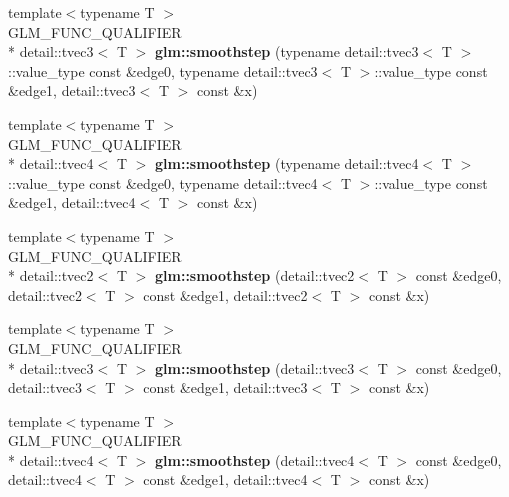 \begin{DoxyCompactItemize}
\item 
\hypertarget{namespaceglm_ad4f7ebb9a2c7c0980deb0580f951ea75}{{\footnotesize template$<$typename T $>$ }\\G\-L\-M\-\_\-\-F\-U\-N\-C\-\_\-\-Q\-U\-A\-L\-I\-F\-I\-E\-R \\*
detail\-::tvec3$<$ T $>$ {\bfseries glm\-::smoothstep} (typename detail\-::tvec3$<$ T $>$\-::value\-\_\-type const \&edge0, typename detail\-::tvec3$<$ T $>$\-::value\-\_\-type const \&edge1, detail\-::tvec3$<$ T $>$ const \&x)}\label{namespaceglm_ad4f7ebb9a2c7c0980deb0580f951ea75}

\item 
\hypertarget{namespaceglm_a17525ba6123f56066046fe07b127e006}{{\footnotesize template$<$typename T $>$ }\\G\-L\-M\-\_\-\-F\-U\-N\-C\-\_\-\-Q\-U\-A\-L\-I\-F\-I\-E\-R \\*
detail\-::tvec4$<$ T $>$ {\bfseries glm\-::smoothstep} (typename detail\-::tvec4$<$ T $>$\-::value\-\_\-type const \&edge0, typename detail\-::tvec4$<$ T $>$\-::value\-\_\-type const \&edge1, detail\-::tvec4$<$ T $>$ const \&x)}\label{namespaceglm_a17525ba6123f56066046fe07b127e006}

\item 
\hypertarget{namespaceglm_af602ff787e99445553837e916d4268f8}{{\footnotesize template$<$typename T $>$ }\\G\-L\-M\-\_\-\-F\-U\-N\-C\-\_\-\-Q\-U\-A\-L\-I\-F\-I\-E\-R \\*
detail\-::tvec2$<$ T $>$ {\bfseries glm\-::smoothstep} (detail\-::tvec2$<$ T $>$ const \&edge0, detail\-::tvec2$<$ T $>$ const \&edge1, detail\-::tvec2$<$ T $>$ const \&x)}\label{namespaceglm_af602ff787e99445553837e916d4268f8}

\item 
\hypertarget{namespaceglm_ae5221c42b168a958dcc60b053d8610c1}{{\footnotesize template$<$typename T $>$ }\\G\-L\-M\-\_\-\-F\-U\-N\-C\-\_\-\-Q\-U\-A\-L\-I\-F\-I\-E\-R \\*
detail\-::tvec3$<$ T $>$ {\bfseries glm\-::smoothstep} (detail\-::tvec3$<$ T $>$ const \&edge0, detail\-::tvec3$<$ T $>$ const \&edge1, detail\-::tvec3$<$ T $>$ const \&x)}\label{namespaceglm_ae5221c42b168a958dcc60b053d8610c1}

\item 
\hypertarget{namespaceglm_a76ad1cbce32a29bc7eb7d6c2a3a30330}{{\footnotesize template$<$typename T $>$ }\\G\-L\-M\-\_\-\-F\-U\-N\-C\-\_\-\-Q\-U\-A\-L\-I\-F\-I\-E\-R \\*
detail\-::tvec4$<$ T $>$ {\bfseries glm\-::smoothstep} (detail\-::tvec4$<$ T $>$ const \&edge0, detail\-::tvec4$<$ T $>$ const \&edge1, detail\-::tvec4$<$ T $>$ const \&x)}\label{namespaceglm_a76ad1cbce32a29bc7eb7d6c2a3a30330}


\end{DoxyCompactItemize}
